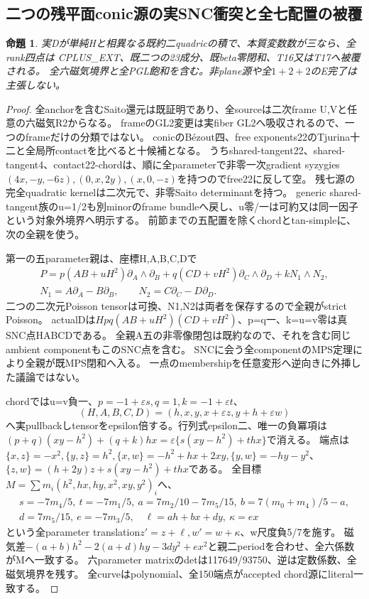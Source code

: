 \documentclass[a4paper,11pt]{ltjsarticle}
\newtheorem{proposition}{命題}[section]
\theoremstyle{definition}
\begin{document}
\subsection{二つの残平面conic源の実SNC衝突と全七配置の被覆}
\begin{proposition}\label{prop:plane-two-conics-whole-E}
実Dが単純Hと相異なる既約二quadricの積で、本質変数数が三なら、全rank四点は
CPLUS\_EXT、既二つの23成分、既beta零閉和、T16又はT17へ被覆される。
全六磁気境界と全PGL飽和を含む。非plane源や全$1+2+2$のE完了は主張しない。
\end{proposition}
\begin{proof}
全anchorを含むSaito還元は既証明であり、全sourceは二次frame U,Vと任意の六磁気R2からなる。
frameのGL2変更は実fiber GL2へ吸収されるので、一つのframeだけの分類ではない。
conicのB\'ezout四、free exponents22のTjurina十二と全局所contactを比べると十候補となる。
うちshared-tangent22、shared-tangent4、contact22-chordは、順に全parameterで非零一次gradient syzygies
$(4x,-y,-6z),(0,x,2y),(x,0,-z)$を持つのでfree22に反して空。
残七源の完全quadratic kernelは二次元で、非零Saito determinantを持つ。
generic shared-tangent族のu=1/2も別minorのframe bundleへ戻し、u零/一は可約又は同一因子という対象外境界へ明示する。
前節までの五配置を除くchordとtan-simpleに、次の全親を使う。

第一の五parameter親は、座標H,A,B,C,Dで
\[
\begin{gathered}
 P=p(AB+uH^2)\partial_A\wedge\partial_B+
 q(CD+vH^2)\partial_C\wedge\partial_D+kN_1\wedge N_2,\\
 N_1=A\partial_A-B\partial_B,\qquad N_2=C\partial_C-D\partial_D.
\end{gathered}
\]
二つの二次元Poisson tensorは可換、N1,N2は両者を保存するので全親がstrict Poisson。
actualDは$Hpq(AB+uH^2)(CD+vH^2)$、p=q一、k=u=v零は真SNC点HABCDである。
全親A五の非零像閉包は既約なので、それを含む同じambient componentもこのSNC点を含む。
SNCに会う全componentのMPS定理により全親が既MPS閉和へ入る。
一点のmembershipを任意変形へ逆向きに外挿した議論ではない。

chordではu=v負一、$p=-1+\varepsilon s,q=1,k=-1+\varepsilon t$、
\[
 (H,A,B,C,D)=(h,x,y,x+\varepsilon z,y+h+\varepsilon w)
\]
へ実pullbackしtensorをepsilon倍する。行列式epsilon二、唯一の負冪項は
$(p+q)(xy-h^2)+(q+k)hx=\varepsilon\{s(xy-h^2)+thx\}$で消える。
端点は$\{x,z\}=-x^2,\{y,z\}=h^2,\{x,w\}=-h^2+hx+2xy,\{y,w\}=-hy-y^2$、
$\{z,w\}=(h+2y)z+s(xy-h^2)+thx$である。
全目標$M=\sum m_i(h^2,hx,hy,x^2,xy,y^2)_i$へ、
\[
\begin{gathered}
 s=-7m_4/5,\ t=-7m_1/5,\ a=7m_2/10-7m_5/15,\ b=7(m_0+m_4)/5-a,\\
 d=7m_5/15,\ e=-7m_3/5,\quad \ell=ah+bx+dy,\ \kappa=ex
\end{gathered}
\]
という全parameter translation$z'=z+\ell,w'=w+\kappa$、w尺度負5/7を施す。
磁気差$-(a+b)h^2-2(a+d)hy-3dy^2+ex^2$と親二periodを合わせ、全六係数がMへ一致する。
六parameter matrixのdetは117649/93750、逆は定数係数、全磁気境界を残す。
全curveはpolynomial、全150端点がaccepted chord源にliteral一致する。


\end{proof}
\end{document}
